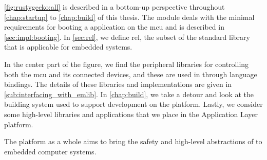 \autoref{fig:rustygecko:all} is described in a bottom-up perspective throughout \autoref{chap:startup} to \autoref{chap:build} of this thesis.
The  module deals with the minimal requirements for booting a {\rust} application on the \gls{mcu} and is described in \autoref{sec:impl:booting}.
In \autoref{sec:rel}, we define \gls{rel}, the subset of the {\rust} standard library that is applicable for embedded systems.

In the center part of the figure, we find the peripheral libraries for controlling both the \gls{mcu} and its connected devices, and these are used in {\rust} through language bindings.
The details of these libraries and implementations are given in \autoref{sub:interfacing_with_emlib}.
In \autoref{chap:build}, we take a detour and look at the building system used to support development on the {\rg} platform.
Lastly, we consider some high-level libraries and applications that we place in the Application Layer platform.

The {\rg} platform as a whole aims to bring the safety and high-level abstractions of {\rust} to embedded computer systems.
